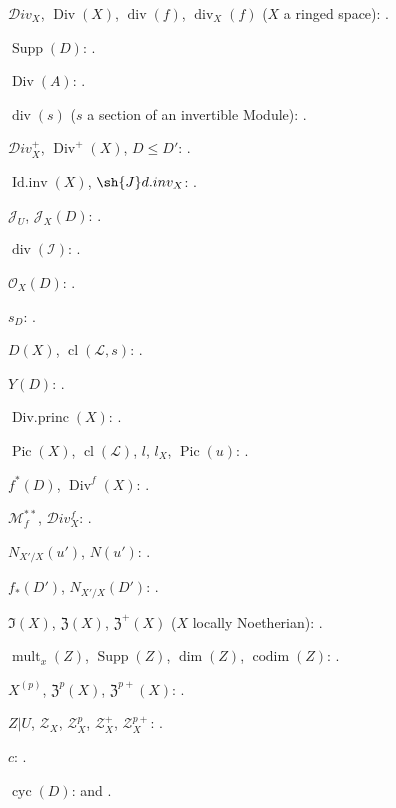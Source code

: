 $\mathcal{D}iv_X$, $\operatorname{Div}(X)$, $\operatorname{div}(f)$,
$\operatorname{div}_X(f)$ ($X$ a ringed space): .

$\operatorname{Supp}(D)$: .

$\operatorname{Div}(A)$: .

$\operatorname{div}(s)$ ($s$ a section of an invertible Module):
.

$\mathcal{D}iv_X^+$, $\operatorname{Div}^+(X)$, $D\leq D'$:
.

$\operatorname{Id.inv}(X)$, $\sh{J}d.inv_X$:
.

$\mathcal J_U$, $\mathcal J_X(D)$: .

$\operatorname{div}(\mathcal I)$: .

$\mathcal O_X(D)$: .

$s_D$: .

$D(X)$, $\operatorname{cl}(\mathcal L,s)$: .

$Y(D)$: .

$\operatorname{Div.princ}(X)$: .

$\operatorname{Pic}(X)$, $\operatorname{cl}(\mathcal L)$, $l$, $l_X$,
$\operatorname{Pic}(u)$: .

$f^*(D)$, $\operatorname{Div}^f(X)$: .

$\mathcal M_f^{**}$, $\mathcal{D}iv_X^f$: .

$N_{X'/X}(u')$, $N(u')$: .

$f_*(D')$, $N_{X'/X}(D')$: .

$\mathfrak I(X)$, $\mathfrak Z(X)$, $\mathfrak Z^+(X)$
($X$ locally Noetherian): .

$\operatorname{mult}_x(Z)$, $\operatorname{Supp}(Z)$,
$\dim(Z)$, $\operatorname{codim}(Z)$: .

$X^{(p)}$, $\mathfrak Z^p(X)$, $\mathfrak Z^{p+}(X)$:
.

$Z|U$, $\mathscr Z_X$, $\mathscr Z_X^p$, $\mathscr Z_X^+$,
$\mathscr Z_X^{p+}$: .

$c$: .

$\operatorname{cyc}(D)$:  and
.

